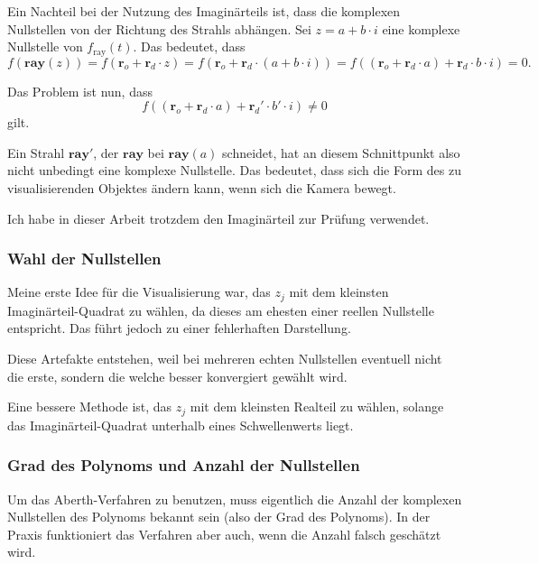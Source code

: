 \documentclass[
	ngerman,%
	accentcolor=9c,%
	ruledheaders=section,%
	class=report,%
	thesis={type=bachelor},%
	fontsize=11pt,%
	parskip=half-,%
	custommargins=true,%
	marginpar=false,%
]{tudapub}
\begin{document}


Ein Nachteil bei der Nutzung des Imaginärteils ist, dass die komplexen Nullstellen von der Richtung des Strahls abhängen.  
Sei \( z = a + b \cdot i \) eine komplexe Nullstelle von \( f_{\text{ray}}(t) \).  
Das bedeutet, dass
\[
f(\mathbf{ray}(z)) = f(\mathbf{r}_o + \mathbf{r}_d \cdot z) = f(\mathbf{r}_o + \mathbf{r}_d \cdot (a + b \cdot i)) = f((\mathbf{r}_o + \mathbf{r}_d \cdot a) + \mathbf{r}_d \cdot b \cdot i) = 0.
\]

Das Problem ist nun, dass
\[
f((\mathbf{r}_o + \mathbf{r}_d \cdot a) + \mathbf{r}_d' \cdot b' \cdot i) \neq 0
\]
gilt.

Ein Strahl \(\mathbf{ray}'\), der \(\mathbf{ray}\) bei \(\mathbf{ray}(a)\) schneidet, hat an diesem Schnittpunkt also nicht unbedingt eine komplexe Nullstelle. Das bedeutet, dass sich die Form des zu visualisierenden Objektes ändern kann, wenn sich die Kamera bewegt.

Ich habe in dieser Arbeit trotzdem den Imaginärteil zur Prüfung verwendet.

\subsubsection*{Wahl der Nullstellen}

Meine erste Idee für die Visualisierung war, das \( z_j \) mit dem kleinsten Imaginärteil-Quadrat zu wählen, da dieses am ehesten einer reellen Nullstelle entspricht. Das führt jedoch zu einer fehlerhaften Darstellung.

Diese Artefakte entstehen, weil bei mehreren echten Nullstellen eventuell nicht die erste, sondern die welche besser konvergiert gewählt wird.

Eine bessere Methode ist, das \( z_j \) mit dem kleinsten Realteil zu wählen, solange das Imaginärteil-Quadrat unterhalb eines Schwellenwerts liegt.

\subsubsection*{Grad des Polynoms und Anzahl der Nullstellen}

Um das Aberth-Verfahren zu benutzen, muss eigentlich die Anzahl der komplexen Nullstellen des Polynoms bekannt sein (also der Grad des Polynoms). In der Praxis funktioniert das Verfahren aber auch, wenn die Anzahl falsch geschätzt wird.
\end{document}
